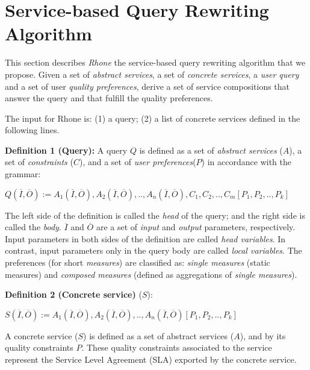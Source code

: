 \section{Service-based Query Rewriting Algorithm}
\label{sec:rhone} 
This section describes \textit{Rhone} the service-based query rewriting algorithm that we propose. Given
a set of \textit{abstract services}, a set of \textit{concrete services}, a
\textit{user query} and a set of user \textit{quality preferences}, derive a set
of service compositions that answer the query and that fulfill the quality preferences.

The  input for  Rhone  is: (1) a query; (2) a list of concrete services defined in the following lines.

\noindent \textbf{Definition 1 (Query):} 
A query $Q$ is defined as a set of \textit{abstract services} ($A$), a set of \textit{constraints} ($C$), and a set of \textit{user preferences}($P$) in accordance with the grammar: 

\begin{center}
$Q (\overline{I}, \overline{O}) := A_{1}(\overline{I}, \overline{O}), A_{2}(\overline{I}, \overline{O}), ..,  A_{n}(\overline{I}, \overline{O}),C_{1},C_{2}, .., C_{m}[P_{1},P_{2}, .., P_{k}]$
\end{center}  

The left side of the definition is called the \textit{head} of the query; and the right side is called the \textit{body}. 
$\overline{I}$ and $\overline{O}$ are a set of \textit{input} and \textit{output} parameters, respectively.
Input parameters in both sides of the definition are called \textit{head variables}.
In contrast, input parameters only in the query body are called \textit{local variables}.
The preferences (for short \textit{measures}) are classified as: \textit{single measures} (static measures) and \textit{composed measures} (defined as aggregations of \textit{single measures}).
%

\noindent \textbf{Definition 2 (Concrete service)}  ($S$):
\begin{center}
$S (\overline{I}, \overline{O}) := A_{1}(\overline{I}, \overline{O}), A_{2}(\overline{I}, \overline{O}), ..,  A_{n}(\overline{I}, \overline{O})[P_{1},P_{2}, .., P_{k}]$
\end{center}  

A concrete service ($S$) is defined as a set of abstract services ($A$), and by its quality constraints $P$. 
These quality constraints associated to the service represent the Service Level Agreement (SLA) exported by the concrete service.


